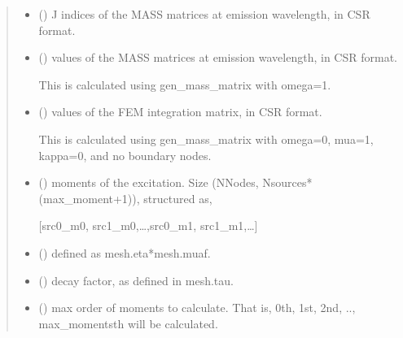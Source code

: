 \documentclass[letterpaper,10pt,english]{sphinxmanual}
\begin{document}
\begin{fulllineitems}
\begin{quote}
\begin{description}
\begin{itemize}
\item {} 
\sphinxAtStartPar
{} (\sphinxstyleliteralemphasis{\sphinxupquote{, }}) \textendash{} J indices of the MASS matrices at emission wavelength, in CSR format.

\item {} 
\sphinxAtStartPar
{} () \textendash{} 
\sphinxAtStartPar
values of the MASS matrices at emission wavelength, in CSR format.

\sphinxAtStartPar
This is calculated using gen\_mass\_matrix with omega=1.


\item {} 
\sphinxAtStartPar
{} () \textendash{} 
\sphinxAtStartPar
values of the FEM integration matrix, in CSR format.

\sphinxAtStartPar
This is calculated using gen\_mass\_matrix with omega=0, mua=1, kappa=0, and no boundary nodes.


\item {} 
\sphinxAtStartPar
{} () \textendash{} 
\sphinxAtStartPar
moments of the excitation. Size (NNodes, Nsources*(max\_moment+1)), structured as,

\sphinxAtStartPar
{[}src0\_m0, src1\_m0,…,src0\_m1, src1\_m1,…{]}


\item {} 
\sphinxAtStartPar
{} () \textendash{} defined as mesh.eta*mesh.muaf.

\item {} 
\sphinxAtStartPar
{} () \textendash{} decay factor, as defined in mesh.tau.

\item {} 
\sphinxAtStartPar
{} () \textendash{} 
\sphinxAtStartPar
max order of moments to calculate. That is, 0th, 1st, 2nd, .., max\_moments\sphinxhyphen{}th will be calculated.


\end{itemize}
\end{description}
\end{quote}
\end{fulllineitems}
\end{document}

